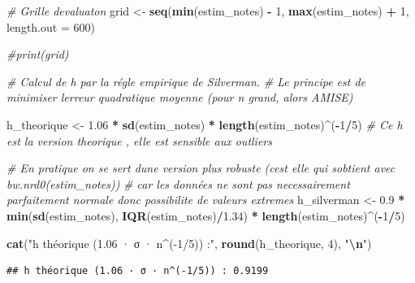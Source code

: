 \documentclass[
  12pt,
]{article}
\newenvironment{Shaded}{\begin{snugshade}}{\end{snugshade}}
\newcommand{\AttributeTok}[1]{\textcolor[rgb]{0.13,0.29,0.53}{#1}}
\newcommand{\CommentTok}[1]{\textcolor[rgb]{0.56,0.35,0.01}{\textit{#1}}}
\newcommand{\DecValTok}[1]{\textcolor[rgb]{0.00,0.00,0.81}{#1}}
\newcommand{\FloatTok}[1]{\textcolor[rgb]{0.00,0.00,0.81}{#1}}
\newcommand{\FunctionTok}[1]{\textcolor[rgb]{0.13,0.29,0.53}{\textbf{#1}}}
\newcommand{\NormalTok}[1]{#1}
\newcommand{\OtherTok}[1]{\textcolor[rgb]{0.56,0.35,0.01}{#1}}
\newcommand{\SpecialCharTok}[1]{\textcolor[rgb]{0.81,0.36,0.00}{\textbf{#1}}}
\newcommand{\StringTok}[1]{\textcolor[rgb]{0.31,0.60,0.02}{#1}}
\begin{document}
\begin{Shaded}
\begin{Highlighting}[]
\CommentTok{\# Grille d\textquotesingle{}evaluaton}
\NormalTok{grid }\OtherTok{\textless{}{-}} \FunctionTok{seq}\NormalTok{(}\FunctionTok{min}\NormalTok{(estim\_notes) }\SpecialCharTok{{-}} \DecValTok{1}\NormalTok{, }\FunctionTok{max}\NormalTok{(estim\_notes) }\SpecialCharTok{+} \DecValTok{1}\NormalTok{, }\AttributeTok{length.out =} \DecValTok{600}\NormalTok{) }

\CommentTok{\#print(grid)}

\CommentTok{\# Calcul de h par la régle empirique de Silverman\textquotesingle{}. }
\CommentTok{\# Le principe est de minimiser l\textquotesingle{}erreur quadratique moyenne (pour n grand, alors AMISE)}

\NormalTok{h\_theorique }\OtherTok{\textless{}{-}} \FloatTok{1.06} \SpecialCharTok{*} \FunctionTok{sd}\NormalTok{(estim\_notes) }\SpecialCharTok{*} \FunctionTok{length}\NormalTok{(estim\_notes)}\SpecialCharTok{\^{}}\NormalTok{(}\SpecialCharTok{{-}}\DecValTok{1}\SpecialCharTok{/}\DecValTok{5}\NormalTok{)}
\CommentTok{\# Ce h est la version theorique , elle est sensible aux outliers}


\CommentTok{\# En pratique on se sert d\textquotesingle{}une version plus robuste (c\textquotesingle{}est elle qui s\textquotesingle{}obtient avec bw.nrd0(estim\_notes))}
\CommentTok{\# car les données ne sont pas necessairement parfaitement normale donc possibilite de valeurs extremes}
\NormalTok{h\_silverman }\OtherTok{\textless{}{-}} \FloatTok{0.9} \SpecialCharTok{*} \FunctionTok{min}\NormalTok{(}\FunctionTok{sd}\NormalTok{(estim\_notes), }\FunctionTok{IQR}\NormalTok{(estim\_notes)}\SpecialCharTok{/}\FloatTok{1.34}\NormalTok{) }\SpecialCharTok{*} \FunctionTok{length}\NormalTok{(estim\_notes)}\SpecialCharTok{\^{}}\NormalTok{(}\SpecialCharTok{{-}}\DecValTok{1}\SpecialCharTok{/}\DecValTok{5}\NormalTok{)}

\FunctionTok{cat}\NormalTok{(}\StringTok{"h théorique (1.06 · σ · n\^{}({-}1/5)) :"}\NormalTok{, }\FunctionTok{round}\NormalTok{(h\_theorique, }\DecValTok{4}\NormalTok{), }\StringTok{"}\SpecialCharTok{\textbackslash{}n}\StringTok{"}\NormalTok{)}
\end{Highlighting}
\end{Shaded}

\begin{verbatim}
## h théorique (1.06 · σ · n^(-1/5)) : 0.9199
\end{verbatim}
\end{document}
